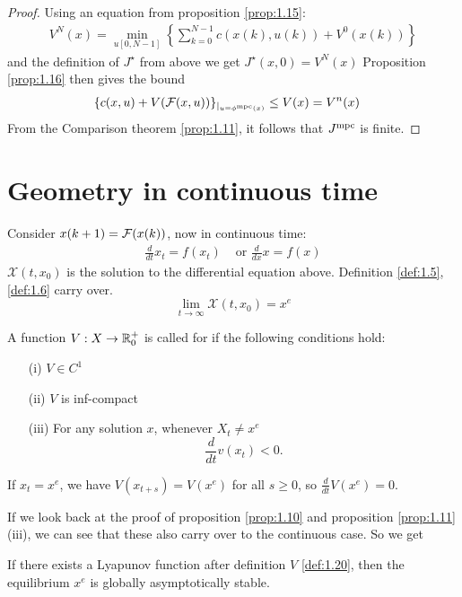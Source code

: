 \begin{proof}
    Using an equation from proposition \ref{prop:1.15}:
    \begin{align*}
        V^N(x)=\min_{u[0,N-1]}\left\{\sum_{k=0}^{N-1}c(x(k),u(k))+V^0(x(k))\right\}
    \end{align*}
    and the definition of \(J^\star\) from above we get \(J^\star(x,0)=V^N(x)\) 
    Proposition \ref{prop:1.16} then gives the bound
    \begin{align*}
        \{c(x,u)+V(\mathcal{F}(x,u))\}_{|_{u=\phi{^{\text{mpc}}}(x)}}&\leq V(x)=V^n(x)        
    \end{align*}
    From the Comparison theorem \ref{prop:1.11}, it follows that \(J{^{\text{mpc}}}\) is finite.
\end{proof}

\section{Geometry in continuous time}

Consider \(x(k+1)=\mathcal{F}(x(k))\), now in continuous time:
\begin{align*}
    \frac{d}{dt}x_t=f(x_t) & \text{ or } \frac{d}{dx} x=f(x)
\end{align*}
\(\mathcal{X}(t,x_0)\) is the solution to the differential equation above.
Definition \ref{def:1.5}, \ref{def:1.6} carry over.
\[\lim_{t\to\infty} \mathcal{X}(t,x_0)=x^e\]
\begin{definition}\label{def:1.20}
    A function \(V:X\to\mathbb{R}_0^+\) is called  for 
     if the following  conditions hold:
    \begin{itemize}
        \item[(i)] \(V\in C^1\)
        \item[(ii)] \(V\) is inf-compact
        \item[(iii)] For any solution \(x\), whenever \(X_t\neq x^e\) \[\frac{d}{dt}v(x_t)<0.\]   
    \end{itemize}
\end{definition}

If \(x_t=x^e\), we have \(V(x_{t+s})=V(x^e)\) for all \(s\geq 0\), so 
\(\frac{d}{dt}V(x^e)=0\).

If we look back at the proof of proposition \ref{prop:1.10} and proposition \ref{prop:1.11} (iii),
we can see that these also carry over to the continuous case. So we get 
\begin{proposition}\label{prop:1.21}
    If there exists a Lyapunov function after definition \(V\) \ref{def:1.20},
    then the equilibrium \(x^e\) is globally asymptotically stable.  
\end{proposition}  

